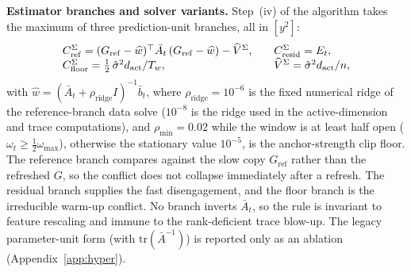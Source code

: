 \documentclass[10pt]{article}
\newcounter{algorithm}
\begin{document}
\textbf{Estimator branches and solver variants.}
Step~(iv) of the algorithm takes the maximum of three prediction-unit branches, all in $[y^2]$:
\[
\begin{array}{@{}l@{\qquad}l@{}}
C^\Sigma_{\mathrm{ref}} = (G_{\mathrm{ref}} - \widehat w)^\top \bar A_t\,(G_{\mathrm{ref}} - \widehat w) - \widehat V^\Sigma, & C^\Sigma_{\mathrm{resid}} = E_t, \\
C^\Sigma_{\mathrm{floor}} = \tfrac12\,\hat\sigma^2 d_{\mathrm{act}}/T_w, & \widehat V^\Sigma = \hat\sigma^2 d_{\mathrm{act}}/n,
\end{array}
\]
with $\widehat w = (\bar A_t + \rho_{\mathrm{ridge}} I)^{-1}\bar b_t$, where $\rho_{\mathrm{ridge}} = 10^{-6}$ is the fixed numerical ridge of the reference-branch data solve ($10^{-8}$ is the ridge used in the active-dimension and trace computations), and $\rho_{\min} = 0.02$ while the window is at least half open ($\omega_t \ge \tfrac12\omega_{\max}$), otherwise the stationary value $10^{-5}$, is the anchor-strength clip floor.
The reference branch compares against the slow copy $G_{\mathrm{ref}}$ rather than the refreshed $G$, so the conflict does not collapse immediately after a refresh. The residual branch supplies the fast disengagement, and the floor branch is the irreducible warm-up conflict.
No branch inverts $\bar A_t$, so the rule is invariant to feature rescaling and immune to the rank-deficient trace blow-up.
The legacy parameter-unit form (with $\mathrm{tr}(\bar A^{-1})$) is reported only as an ablation (Appendix~\ref{app:hyper}).
\end{document}

